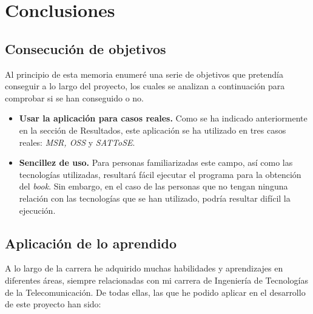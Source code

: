 \documentclass[a4paper, 12pt]{book}
\begin{document}
\cleardoublepage
\chapter{Conclusiones}
\label{chap:conclusiones}


\section{Consecución de objetivos}
\label{sec:consecucion-objetivos}
Al principio de esta memoria enumeré una serie de objetivos que pretendía conseguir a lo largo del proyecto, los cuales se analizan a continuación para comprobar si se han conseguido o no.

\begin{itemize}
  \item \textbf{Usar la aplicación para casos reales.} Como se ha indicado anteriormente en la sección de Resultados, este aplicación se ha utilizado en tres casos reales: \textit{MSR, OSS} y \textit{SATToSE}.
  \item \textbf{Sencillez de uso.} Para personas familiarizadas este campo, así como las tecnologías utilizadas, resultará fácil ejecutar el programa para la obtención del \textit{book}. Sin embargo, en el caso de las personas que no tengan ninguna relación con las tecnologías que se han utilizado, podría resultar difícil la ejecución.
\end{itemize}


\section{Aplicación de lo aprendido}
\label{sec:aplicacion}

A lo largo de la carrera he adquirido muchas habilidades y aprendizajes en diferentes áreas, siempre relacionadas con mi carrera de Ingeniería de Tecnologías de la Telecomunicación. De todas ellas, las que he podido aplicar en el desarrollo de este proyecto han sido:
\end{document}
